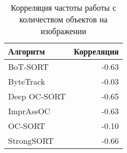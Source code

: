 \begin{table}[htbp]
\caption{Корреляция частоты работы с количеством объектов на изображении}
\label{tab:correlation_fps_object}
\centering
\begin{tabular}{lr}
\toprule
Алгоритм & Корреляция \\
\midrule
BoT-SORT & -0.63 \\
ByteTrack & -0.03 \\
Deep OC-SORT & -0.65 \\
ImprAssOC & -0.63 \\
OC-SORT & -0.10 \\
StrongSORT & -0.66 \\
\bottomrule
\end{tabular}

\end{table}